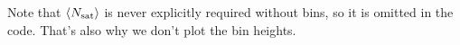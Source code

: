 Note that $\langle N_{\rm sat} \rangle$ is never explicitly required without bins, so it is omitted in the code. 
That's also why we don't plot the bin heights.